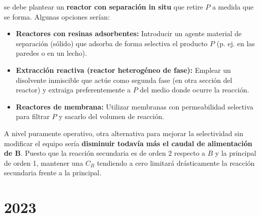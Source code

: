 \begin{enumerate}[label={\alph*)}]
	      \noindent se debe plantear un \textbf{reactor con separación in situ} que retire $P$ a medida que se forma. Algunas opciones serían:
	      \begin{itemize}
		      \item \textbf{Reactores con resinas adsorbentes:} Introducir un agente material de separación (sólido) que adsorba de forma selectiva el producto $P$ (p. ej. en las paredes o en un lecho).
		      \item \textbf{Extracción reactiva (reactor heterogéneo de fase):} Emplear un disolvente inmiscible que actúe como segunda fase (en otra sección del reactor) y extraiga preferentemente a $P$ del medio donde ocurre la reacción.
		      \item \textbf{Reactores de membrana:} Utilizar membranas con permeabilidad selectiva para filtrar $P$ y sacarlo del volumen de reacción.
	      \end{itemize}
	      \noindent A nivel puramente operativo, otra alternativa para mejorar la selectividad sin modificar el equipo sería \textbf{disminuir todavía más el caudal de alimentación de B}. Puesto que la reacción secundaria es de orden 2 respecto a $B$ y la principal de orden 1, mantener una $C_B$ tendiendo a cero limitará drásticamente la reacción secundaria frente a la principal.
\end{enumerate}
\newpage
\section{2023}

\shorthandoff{>}
\shorthandoff{<}


